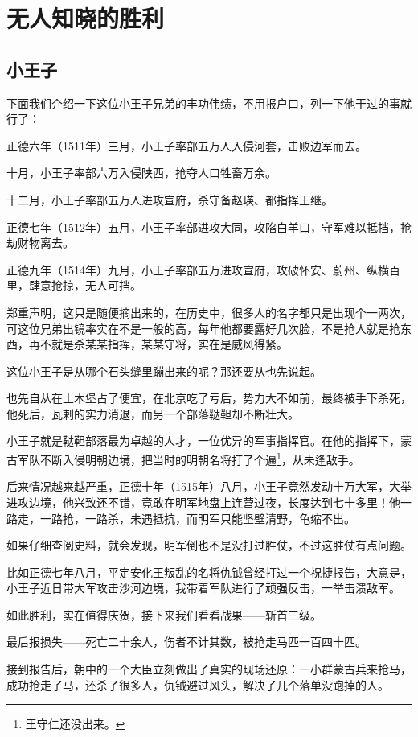 \section{无人知晓的胜利}
\ifnum{}
	\begin{multicols}{\theparacolNo}
\fi
\subsection{小王子}
下面我们介绍一下这位小王子兄弟的丰功伟绩，不用报户口，列一下他干过的事就行了：

正德六年（1511年）三月，小王子率部五万人入侵河套，击败边军而去。

十月，小王子率部六万入侵陕西，抢夺人口牲畜万余。

十二月，小王子率部五万人进攻宣府，杀守备赵瑛、都指挥王继。

正德七年（1512年）五月，小王子率部进攻大同，攻陷白羊口，守军难以抵挡，抢劫财物离去。

正德九年（1514年）九月，小王子率部五万进攻宣府，攻破怀安、蔚州、纵横百里，肆意抢掠，无人可挡。

郑重声明，这只是随便摘出来的，在历史中，很多人的名字都只是出现个一两次，可这位兄弟出镜率实在不是一般的高，每年他都要露好几次脸，不是抢人就是抢东西，再不就是杀某某指挥，某某守将，实在是威风得紧。

这位小王子是从哪个石头缝里蹦出来的呢？那还要从也先说起。

也先自从在土木堡占了便宜，在北京吃了亏后，势力大不如前，最终被手下杀死，他死后，瓦剌的实力消退，而另一个部落鞑靼却不断壮大。

小王子就是鞑靼部落最为卓越的人才，一位优异的军事指挥官。在他的指挥下，蒙古军队不断入侵明朝边境，把当时的明朝名将打了个遍\footnote{王守仁还没出来。}，从未逢敌手。

后来情况越来越严重，正德十年（1515年）八月，小王子竟然发动十万大军，大举进攻边境，他兴致还不错，竟敢在明军地盘上连营过夜，长度达到七十多里！他一路走，一路抢，一路杀，未遇抵抗，而明军只能坚壁清野，龟缩不出。

如果仔细查阅史料，就会发现，明军倒也不是没打过胜仗，不过这胜仗有点问题。

比如正德七年八月，平定安化王叛乱的名将仇钺曾经打过一个祝捷报告，大意是，小王子近日带大军攻击沙河边境，我带着军队进行了顽强反击，一举击溃敌军。

如此胜利，实在值得庆贺，接下来我们看看战果——斩首三级。

最后报损失——死亡二十余人，伤者不计其数，被抢走马匹一百四十匹。

接到报告后，朝中的一个大臣立刻做出了真实的现场还原：一小群蒙古兵来抢马，成功抢走了马，还杀了很多人，仇钺避过风头，解决了几个落单没跑掉的人。


\end{multicols}
